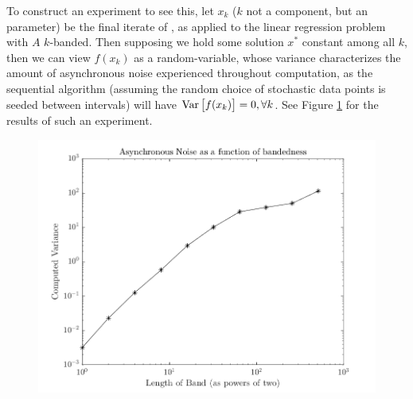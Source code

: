 To construct an experiment to see this, let $x_k$ ($k$ not a component, but an
parameter) be the final iterate of \hogwild, as applied to the linear regression
problem with $A$ $k$-banded. Then supposing we hold some solution $x^*$ constant
among all $k$, then we can view $f(x_k)$ as a random-variable, whose variance
characterizes the amount of asynchronous noise experienced throughout
computation, as the sequential algorithm (assuming the random choice of
stochastic data points is seeded between intervals) will have ${\rm Var}\left[f(x_k)\right] = 0,
\forall k$. See Figure \ref{fig:variances} for the results of such an
experiment.
\begin{figure}[!htb]
  \centering
  \includegraphics[width=.8\textwidth]{./resources/banded_asyncnoise}
  \caption{
  } \label{fig:variances}
\end{figure}
